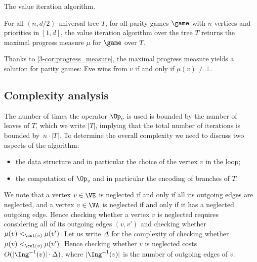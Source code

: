 \begin{algorithm}[ht]
 \DontPrintSemicolon

     

\Return{$\mu$}
\caption{The value iteration algorithm.}
\label{3-algo:value_iteration}
\end{algorithm}

\begin{theorem}
For all $(n, d/2)$-universal tree $T$, for all parity games $\game$ with $n$ vertices and priorities in $[1,d]$,
the value iteration algorithm over the tree $T$ returns the maximal progress measure $\mu$ for $\game$ over $T$.
\end{theorem}

Thanks to \cref{3-cor:progress_measure}, the maximal progress measure yields a solution for parity games:
Eve wins from $v$ if and only if $\mu(v) \neq \bot$.

\subsection*{Complexity analysis}
The number of times the operator $\Op_v$ is used is bounded by the number of leaves of $T$,
which we write $|T|$, implying that the total number of iterations is bounded by~$n \cdot |T|$.
To determine the overall complexity we need to discuss two aspects of the algorithm:
\begin{itemize}
	\item the data structure and in particular the choice of the vertex $v$ in the loop;
	\item the computation of $\Op_v$ and in particular the encoding of branches of $T$.
\end{itemize}

We note that a vertex $v \in \VE$ is neglected if and only if all its outgoing edges are neglected,
and a vertex $v \in \VA$ is neglected if and only if it has a neglected outgoing edge.
Hence checking whether a vertex $v$ is neglected requires considering all of its outgoing edges $(v,v')$
and checking whether $\mu(v) \vartriangleleft_{\col(v)} \mu(v')$.
Let us write $\Delta$ for the complexity of checking whether $\mu(v) \vartriangleleft_{\col(v)} \mu(v')$.
Hence checking whether $v$ is neglected costs 
$O(|\Ing^{-1}(v)| \cdot \Delta)$, where $|\Ing^{-1}(v)|$ is the number of outgoing edges of $v$.

